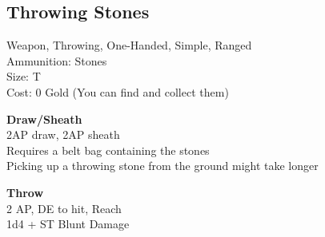 \subsection{Throwing Stones}\label{weapon:throwingStones}
Weapon, Throwing, One-Handed, Simple, Ranged\\
Ammunition: Stones\\
Size: T\\
Cost: 0 Gold (You can find and collect them)

\textbf{Draw/Sheath}\\
2AP draw, 2AP sheath\\
Requires a belt bag containing the stones\\
Picking up a throwing stone from the ground might take longer

\textbf{Throw}\\
2 AP, DE to hit,  Reach\\
1d4 + \texttimes ST Blunt Damage

